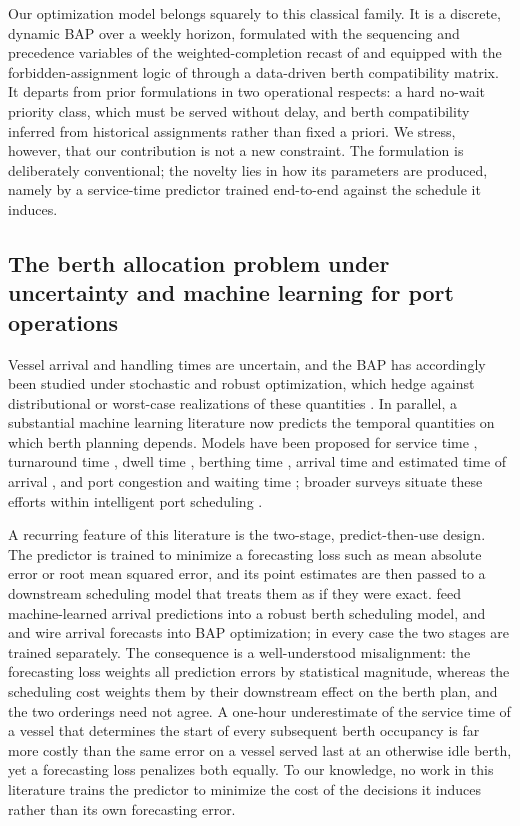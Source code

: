 Our optimization model belongs squarely to this classical family. It is a discrete, dynamic BAP over a weekly horizon, formulated with the sequencing and precedence variables of the weighted-completion recast of \citet{cordeau2005berth} and equipped with the forbidden-assignment logic of \citet{alzaabi2016berth} through a data-driven berth compatibility matrix. It departs from prior formulations in two operational respects: a hard no-wait priority class, which must be served without delay, and berth compatibility inferred from historical assignments rather than fixed a priori. We stress, however, that our contribution is not a new constraint. The formulation is deliberately conventional; the novelty lies in how its parameters are produced, namely by a service-time predictor trained end-to-end against the schedule it induces.

\subsection{The berth allocation problem under uncertainty and machine learning for port operations}\label{sec:related-uncertainty}

Vessel arrival and handling times are uncertain, and the BAP has accordingly been studied under stochastic and robust optimization, which hedge against distributional or worst-case realizations of these quantities \citep{rodrigues2022uncertainty}. In parallel, a substantial machine learning literature now predicts the temporal quantities on which berth planning depends. Models have been proposed for service time \citep{yan2024predicting}, turnaround time \citep{chu2024vessel}, dwell time \citep{yoon2023comparative}, berthing time \citep{pham2025berthing}, arrival time and estimated time of arrival \citep{chu2025vessel, jiang2025review}, and port congestion and waiting time \citep{choi2025waiting}; broader surveys situate these efforts within intelligent port scheduling \citep{lv2025intelligent}.

A recurring feature of this literature is the two-stage, predict-then-use design. The predictor is trained to minimize a forecasting loss such as mean absolute error or root mean squared error, and its point estimates are then passed to a downstream scheduling model that treats them as if they were exact. \citet{kolley2023robust} feed machine-learned arrival predictions into a robust berth scheduling model, and \citet{chu2025integrating} and \citet{zhang2025dynamic} wire arrival forecasts into BAP optimization; in every case the two stages are trained separately. The consequence is a well-understood misalignment: the forecasting loss weights all prediction errors by statistical magnitude, whereas the scheduling cost weights them by their downstream effect on the berth plan, and the two orderings need not agree. A one-hour underestimate of the service time of a vessel that determines the start of every subsequent berth occupancy is far more costly than the same error on a vessel served last at an otherwise idle berth, yet a forecasting loss penalizes both equally. To our knowledge, no work in this literature trains the predictor to minimize the cost of the decisions it induces rather than its own forecasting error.

